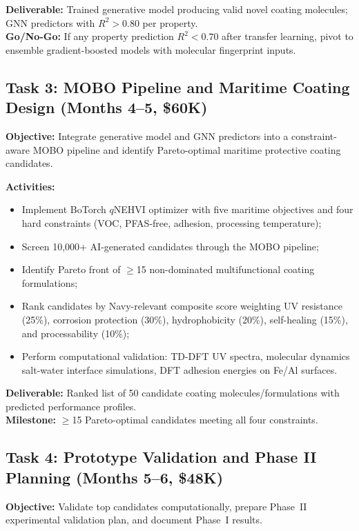 \documentclass[11pt,letterpaper]{article}
\begin{document}
\textbf{Deliverable:} Trained generative model producing valid novel coating
molecules; GNN predictors with $R^2 > 0.80$ per property.\\
\textbf{Go/No-Go:} If any property prediction $R^2 < 0.70$ after transfer
learning, pivot to ensemble gradient-boosted models with molecular fingerprint
inputs.

\subsection{Task 3: MOBO Pipeline and Maritime Coating Design
(Months 4--5, \$60K)}

\textbf{Objective:} Integrate generative model and GNN predictors into a
constraint-aware MOBO pipeline and identify Pareto-optimal maritime protective
coating candidates.

\textbf{Activities:}
\begin{itemize}[nosep]
  \item Implement BoTorch $q$NEHVI optimizer with five maritime objectives and
    four hard constraints (VOC, PFAS-free, adhesion, processing temperature);
  \item Screen 10,000+ AI-generated candidates through the MOBO pipeline;
  \item Identify Pareto front of $\geq$15 non-dominated multifunctional coating
    formulations;
  \item Rank candidates by Navy-relevant composite score weighting UV resistance
    (25\%), corrosion protection (30\%), hydrophobicity (20\%), self-healing
    (15\%), and processability (10\%);
  \item Perform computational validation: TD-DFT UV spectra, molecular dynamics
    salt-water interface simulations, DFT adhesion energies on Fe/Al surfaces.
\end{itemize}

\textbf{Deliverable:} Ranked list of 50 candidate coating molecules/formulations
with predicted performance profiles.\\
\textbf{Milestone:} $\geq$15 Pareto-optimal candidates meeting all four
constraints.

\subsection{Task 4: Prototype Validation and Phase II Planning
(Months 5--6, \$48K)}

\textbf{Objective:} Validate top candidates computationally, prepare Phase~II
experimental validation plan, and document Phase~I results.
\end{document}
